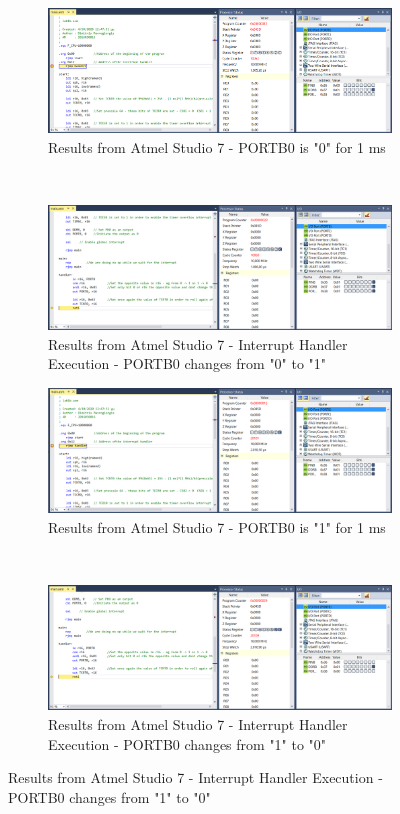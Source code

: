 \documentclass{article}
\begin{document}
\begin{figure}[h!]
	\centering
	\begin{subfigure}[t]{0.5\textwidth}
		\centering
		\includegraphics[width=\linewidth]{./results/lab1b_atmel_result_a.png}
		\caption{Results from Αtmel Studio 7 - PORTB0 is "0" for 1 ms}
	\end{subfigure}%
	~
	\begin{subfigure}[t]{0.5\textwidth}
		\centering
		\includegraphics[width=\linewidth]{./results/lab1b_atmel_result_b.png}
		\caption{Results from Αtmel Studio 7 - Interrupt Handler Execution - PORTB0 changes from "0" to "1"}
	\end{subfigure}
	
	\begin{subfigure}[t]{0.5\textwidth}
		\centering
		\includegraphics[width=\linewidth]{./results/lab1b_atmel_result_c.png}
		\caption{Results from Αtmel Studio 7 - PORTB0 is "1" for 1 ms}
	\end{subfigure}%
	~
	\begin{subfigure}[t]{0.5\textwidth}
		\centering
		\includegraphics[width=\linewidth]{./results/lab1b_atmel_result_d.png}
		\caption{Results from Αtmel Studio 7 - Interrupt Handler Execution - PORTB0 changes from "1" to "0"}
	\end{subfigure}


\end{figure}
\end{document}
